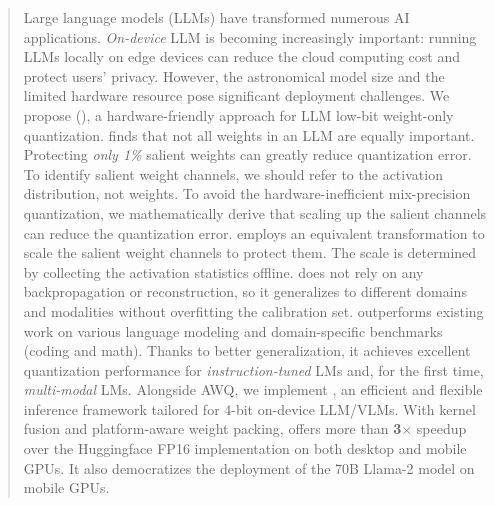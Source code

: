 \begin{abstract}





Large language models (LLMs) have transformed numerous AI applications. \textit{On-device} LLM is becoming increasingly important: running LLMs locally on edge devices can reduce the cloud computing cost and protect users' privacy. However, the astronomical model size and the limited hardware resource pose significant deployment challenges. We propose \method (\methodshort), a hardware-friendly approach for LLM low-bit weight-only quantization. \methodshort finds that not all weights in an LLM are equally important. Protecting \textit{only 1\%} salient weights can greatly reduce quantization error. To identify salient weight channels, we should refer to the activation distribution, not weights. 
To avoid the hardware-inefficient mix-precision quantization, we mathematically derive that scaling up the salient channels can reduce the quantization error.
\methodshort employs an equivalent transformation to scale the salient weight channels to protect them. The scale is determined by collecting the activation statistics offline.
\methodshort does not rely on any backpropagation or reconstruction, so it generalizes to different domains and modalities without overfitting the calibration set. \methodshort outperforms existing work on various language modeling and domain-specific benchmarks (coding and math). Thanks to better generalization, it achieves excellent quantization performance for \emph{instruction-tuned} LMs and, for the first time, \emph{multi-modal} LMs. 
Alongside AWQ, we implement \system, an efficient and flexible inference framework tailored for 4-bit on-device LLM/VLMs. With kernel fusion and platform-aware weight packing, \system offers more than \textbf{3}$\times$ speedup over the Huggingface FP16 implementation on both desktop and mobile GPUs. It also democratizes the deployment of the 70B Llama-2 model on mobile GPUs. 

\end{abstract}


